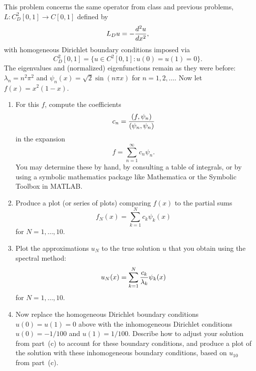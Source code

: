 This problem concerns the same operator from class and previous problems, $L: C^2_D[0,1]\to C[0,1]$ defined by
\[ L_D u = -{d^2 u \over dx^2},\]
with homogeneous Dirichlet boundary conditions imposed via
\[ C^2_D[0,1] = \{ u \in C^2[0,1] : u(0) = u(1) = 0\}.\]
The eigenvalues and (normalized) eigenfunctions remain as they were before:
$\lambda_n = n^2 \pi^2$ and $\psi_n(x) = \sqrt{2} \sin(n \pi x)$ for 
$n=1,2,\ldots.$ Now let $f(x) = x^2(1-x)$.
\begin{enumerate}
   \item For this $f$, compute the coefficients 
         \[ c_n = {(f,\psi_n)\over (\psi_n,\psi_n)} \]
         in the expansion
                \[ f = \sum_{n=1}^\infty c_n \psi_n.\]
         You may determine these by hand, by consulting a table of integrals,
         or by using a symbolic mathematics package like Mathematica
         or the Symbolic Toolbox in MATLAB.  

   \item Produce a plot (or series of plots) comparing $f(x)$ 
         to the partial sums 
               \[ f_N(x) = \sum_{k=1}^N c_k \psi_k(x)\]
         for $N=1, \ldots, 10$.

   \item Plot the approximations $u_N$ to the true solution $u$ 
         that you obtain using the spectral method:
               \[ u_N(x) = \sum_{k=1}^N {c_k \over \lambda_k} \psi_k(x)\]
         for $N=1, \ldots, 10$.

   \item Now replace the homogeneous Dirichlet boundary conditions $u(0) = u(1) = 0$ above
         with the inhomogeneous Dirichlet conditions $u(0) = -1/100$ and $u(1) = 1/100$.
         Describe how to adjust your solution from part~(c) to account for these
          boundary conditions, and produce a plot of the solution with these
          inhomogeneous boundary conditions, based on $u_{10}$ from part~(c).
\end{enumerate}

           



